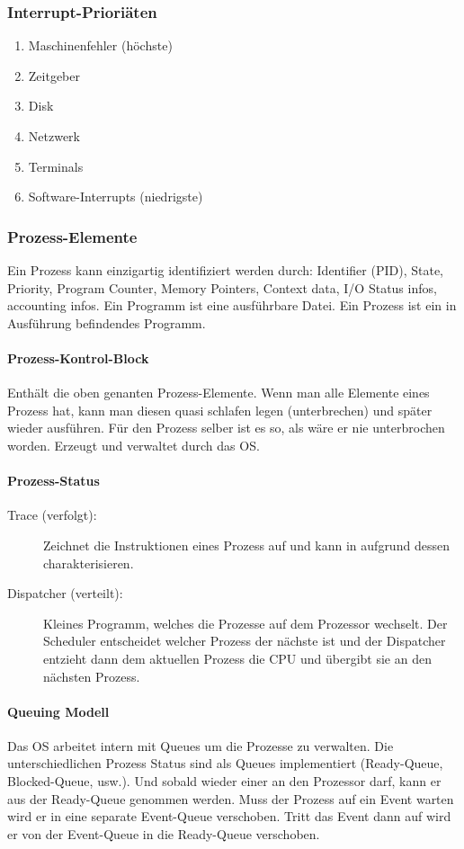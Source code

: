 \subsubsection{Interrupt-Prioriäten}
\begin{enumerate}
	\item Maschinenfehler (höchste)
	\item Zeitgeber
	\item Disk
	\item Netzwerk
	\item Terminals
	\item Software-Interrupts (niedrigste)
\end{enumerate}

\subsubsection{Prozess-Elemente}
Ein Prozess kann einzigartig identifiziert werden durch: Identifier (PID), State, Priority, Program Counter, Memory Pointers, Context data, I/O Status infos, accounting infos. Ein Programm ist eine ausführbare Datei. Ein Prozess ist ein in Ausführung befindendes Programm.

\paragraph{Prozess-Kontrol-Block} Enthält die oben genanten Prozess-Elemente. Wenn man alle Elemente eines Prozess hat, kann man diesen quasi schlafen legen (unterbrechen) und später wieder ausführen. Für den Prozess selber ist es so, als wäre er nie unterbrochen worden. Erzeugt und verwaltet durch das OS.

\paragraph{Prozess-Status}
\begin{description}
	\item[Trace (verfolgt):] Zeichnet die Instruktionen eines Prozess auf und kann in aufgrund dessen charakterisieren.
	\item[Dispatcher (verteilt):] Kleines Programm, welches die Prozesse auf dem Prozessor wechselt. Der Scheduler entscheidet welcher Prozess der nächste ist und der Dispatcher entzieht dann dem aktuellen Prozess die CPU und übergibt sie an den nächsten Prozess.
\end{description}

\paragraph{Queuing Modell} Das OS arbeitet intern mit Queues um die Prozesse zu verwalten. Die unterschiedlichen Prozess Status sind als Queues implementiert (Ready-Queue, Blocked-Queue, usw.). Und sobald wieder einer an den Prozessor darf, kann er aus der Ready-Queue genommen werden. Muss der Prozess auf ein Event warten wird er in eine separate Event-Queue verschoben. Tritt das Event dann auf wird er von der Event-Queue in die Ready-Queue verschoben.

